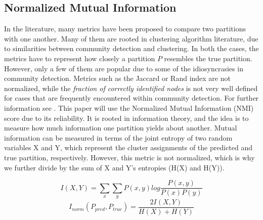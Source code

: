 \documentclass[11pt, twocolumn]{article}
\begin{document}
\subsection{Normalized Mutual Information} 
In the literature, many metrics have been proposed to compare two partitions with one another. Many of them are rooted in clustering algorithm literature, due to similarities between community detection and clustering. In both the cases, the metrics have to represent how closely a partition $P$ resembles the true partition. However, only a few of them are popular due to some of the idiosyncrasies in community detection. Metrics such as the Jaccard or Rand index are not normalized, while the \emph{fraction of correctly identified nodes} is not very well defined for cases that are frequently encountered within community detection. For further information see \citeauthor{fortunato_CommunityDetectionNetworks_2016}. This paper will use the Normalized Mutual Information (NMI) score due to its reliability. It is rooted in information theory, and the idea is to measure how much information one partition yields about another. Mutual information can be measured in terms of the joint entropy of two random variables X and Y, which represent the cluster assignments of the predicted and true partition, respectively. However, this metric is not normalized, which is why we further divide by the sum of X and Y's entropies (H(X) and H(Y)). 

\begin{equation}
I(X,Y) = \sum_x\sum_y P(x,y) log\frac{P(x,y)}{P(x)P(y)}
\end{equation}
\begin{equation}
I_{norm}(P_{pred},P_{true}) = \frac{2I(X,Y)}{H(X) + H(Y)}
\end{equation}
\end{document}
